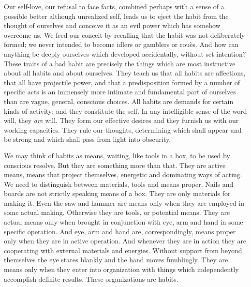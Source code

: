 \documentclass[12pt]{article}
\begin{document}
Our self-love, our refusal to face facts, combined
perhaps with a sense of a possible better although
unrealized self, leads us to eject the habit from the
thought of ourselves and conceive it as an evil power
which has somehow overcome us. We feed our conceit
by recalling that the habit was not deliberately formed;
we never intended to become idlers or gamblers or rouès.
And how can anything be deeply ourselves which developed
accidentally, without set intention? These
traits of a bad habit are precisely the things which are
most instructive about all habits and about ourselves.
They teach us that all habits are affections, that all
have projectile power, and that a predisposition
formed by a number of specific acts is an immensely
more intimate and fundamental part of ourselves than
are vague, general, conscious choices. All habits are
demands for certain kinds of activity; and they constitute
the self. In any intelligible sense of the word
will, they \emph{are} will. They form our effective desires and
they furnish us with our working capacities. They
rule our thoughts, determining which shall appear and
be strong and which shall pass from light into
obscurity.

We may think of habits as means, waiting, like tools
in a box, to be used by conscious resolve. But they
are something more than that. They are active means,
means that project themselves, energetic and dominating
ways of acting. We need to distinguish between
materials, tools and means proper. Nails and boards
are not strictly speaking means of a box. They are
only materials for making it. Even the saw and hammer
are means only when they are employed in some
actual making. Otherwise they are tools, or potential
means. They are actual means only when brought in
conjunction with eye, arm and hand in some specific
operation. And eye, arm and hand are, correspondingly,
means proper only when they are in active operation.
And whenever they are in action they are cooperating
with external materials and energies. Without
support from beyond themselves the eye stares blankly
and the hand moves fumblingly. They are means only
when they enter into organization with things which
independently accomplish definite results. These organizations
are habits.
\end{document}
